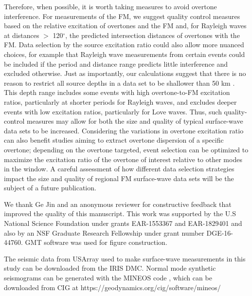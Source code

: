 \documentclass[extra,mreferee]{gji}
\begin{document}
Therefore, when possible, it is worth taking measures to avoid overtone interference. For measurements of the FM, we suggest quality control measures based on the relative excitation of overtones and the FM and, for Rayleigh waves at distances $>$ 120$^\circ$, the predicted intersection distances of overtones with the FM. Data selection by the source excitation ratio could also allow more nuanced choices, for example that Rayleigh wave measurements from certain events could be included if the period and distance range predicts little interference and excluded otherwise. Just as importantly, our calculations suggest that there is no reason to restrict all source depths in a data set to be shallower than 50 km  \citep[e.g.][]{jin2015crust,accardo2017surface,adams2018relationships,babikoff2019long}. This depth range includes some events with high overtone-to-FM excitation ratios, particularly at shorter periods for Rayleigh waves, and excludes deeper events with low excitation ratios, particularly for Love waves. Thus, such quality-control measures may allow for both the size and quality of typical surface-wave data sets to be increased. Considering the variations in overtone excitation ratio can also benefit studies aiming to extract overtone dispersion of a specific overtone; depending on the overtone targeted, event selection can be optimized to maximize the excitation ratio of the overtone of interest relative to other modes in the window.  A careful assessment of how different data selection strategies impact the size and quality of regional FM surface-wave data sets will be the subject of a future publication.  

\newpage 

\begin{acknowledgments}
We thank Ge Jin and an anonymous reviewer for constructive feedback that improved the quality of this manuscript.  This work was supported by the U.S National Science Foundation under grants EAR-1553367 and EAR-1829401 and also by an NSF Graduate Research Fellowship under grant number DGE-16-44760. GMT software \citep{wessel1998new} was used for figure construction.
\end{acknowledgments}

\begin{dataavailability}
The seismic data from USArray used to make surface-wave measurements in this study can be downloaded from the IRIS DMC. Normal mode synthetic seismograms can be generated with the MINEOS code \citep{mineosbro}, which can be downloaded from CIG at https://geodynamics.org/cig/software/mineos/
\end{dataavailability}





\label{lastpage}
\end{document}
